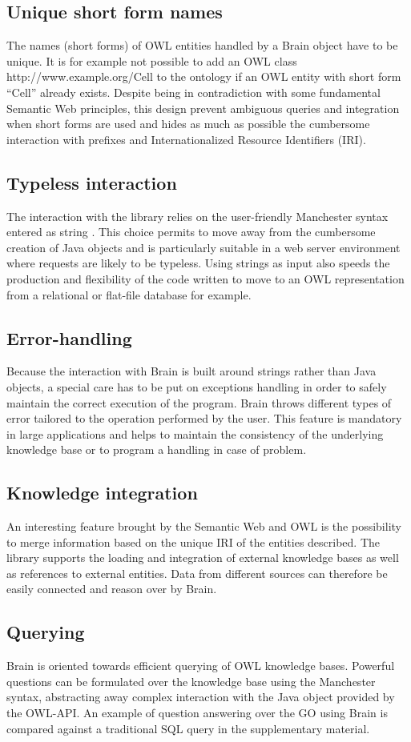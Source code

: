 \documentclass{bioinfo}
\begin{document}
\subsection{Unique short form names}
The names (short forms) of OWL entities handled by a Brain object have to be unique. It is for example not possible to add
an OWL class http://www.example.org/Cell to the ontology if an OWL entity with short form ``Cell'' already exists.
Despite being in contradiction with some fundamental Semantic Web principles, this design prevent ambiguous queries and integration when 
short forms are used and hides as much as possible the cumbersome interaction with prefixes and Internationalized Resource Identifiers (IRI).
\subsection{Typeless interaction}
The interaction with the library relies on the user-friendly Manchester syntax entered as string \citep{Horridge2006}. 
This choice permits to move away from the cumbersome creation of Java objects and is particularly suitable in a web server environment where
requests are likely to be typeless. Using strings as input also speeds the production
and flexibility of the code written to move to an OWL representation from a relational or flat-file database for example.
\subsection{Error-handling}
Because the interaction with Brain is built around strings rather than Java objects, a special care has to be put on
exceptions handling in order to safely maintain the correct execution of the program. Brain throws different types of error tailored 
to the operation performed by the user. This feature is mandatory in large applications and helps to maintain the consistency of the underlying
knowledge base or to program a handling in case of problem.
\subsection{Knowledge integration}
An interesting feature brought by the Semantic Web and OWL is the possibility to merge information based
on the unique IRI of the entities described. The library supports the loading and integration of external knowledge bases as well as 
references to external entities. Data from different sources can therefore be easily connected and reason over by Brain.
\subsection{Querying}
Brain is oriented towards efficient querying of OWL knowledge bases.
Powerful questions can be formulated over the knowledge base using the Manchester syntax, abstracting
away complex interaction with the Java object provided by the OWL-API. An example of question answering over the GO using Brain
is compared against a traditional SQL query in the supplementary material.
\end{document}
